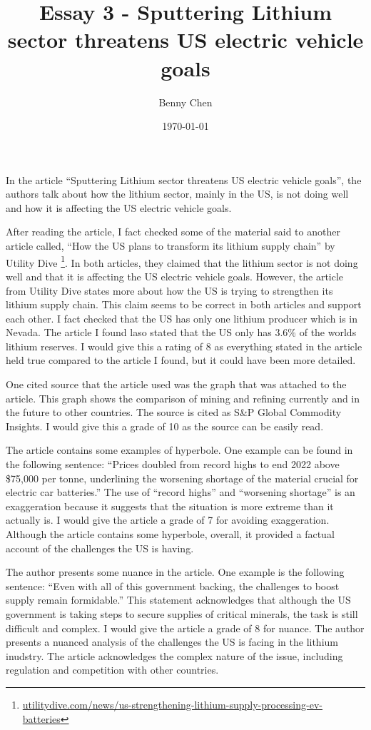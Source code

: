 \documentclass{article}
\title{Essay 3 - Sputtering Lithium sector threatens US electric vehicle goals}
\author{Benny Chen}
\date{\today}
\begin{document}
\maketitle

In the article ``Sputtering Lithium sector threatens US electric vehicle goals'', the authors talk about how the lithium sector, mainly in the US, is not doing well and how it is affecting the US electric vehicle goals. 

After reading the article, I fact checked some of the material said to another article called, ``How the US plans to transform its lithium supply chain'' by Utility Dive \footnote[1]{\url{utilitydive.com/news/us-strengthening-lithium-supply-processing-ev-batteries}}. In both articles, they claimed that the lithium sector is not doing well and that it is affecting the US electric vehicle goals. However, the article from Utility Dive states more about how the US is trying to strengthen its lithium supply chain. This claim seems to be correct in both articles and support each other. I fact checked that the US has only one lithium producer which is in Nevada. The article I found laso stated that the US only has 3.6\% of the worlds lithium reserves. I would give this a rating of 8 as everything stated in the article held true compared to the article I found, but it could have been more detailed.

One cited source that the article used was the graph that was attached to the article. This graph shows the comparison of mining and refining currently and in the future to other countries. The source is cited as S\&P Global Commodity Insights. I would give this a grade of 10 as the source can be easily read.

The article contains some examples of hyperbole. One example can be found in the following sentence: ``Prices doubled from record highs to end 2022 above \$75,000 per tonne, underlining the worsening shortage of the material crucial for electric car batteries.'' The use of ``record highs'' and ``worsening shortage'' is an exaggeration because it suggests that the situation is more extreme than it actually is. I would give the article a grade of 7 for avoiding exaggeration. Although the article contains some hyperbole, overall, it provided a factual account of the challenges the US is having.

The author presents some nuance in the article. One example is the following sentence: ``Even with all of this government backing, the challenges to boost supply remain formidable.'' This statement acknowledges that although the US government is taking steps to secure supplies of critical minerals, the task is still difficult and complex. I would give the article a grade of 8 for nuance. The author presents a nuanced analysis of the challenges the US is facing in the lithium inudstry. The article acknowledges the complex nature of the issue, including regulation and competition with other countries.
\end{document}
